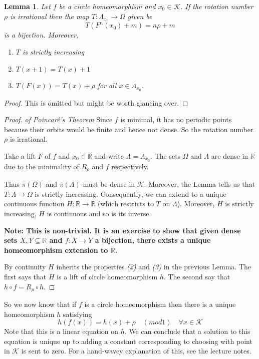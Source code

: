 \documentclass[11pt]{article}
\newcommand{\R}{\mathbb{R}}
\newenvironment{note}
	{\begin{mdframed}[backgroundcolor=white, linecolor=red, roundcorner=5pt, linewidth=1pt]\bfseries{Note:}\normalfont
	\setlength{\parindent}{0pt}}
	{\end{mdframed}}
\newtheorem{lemma}[theorem]{Lemma}
\begin{document}
\begin{lemma}
Let $f$ be a circle homeomorphism and $x_0\in\mathcal{K}$.
If the rotation number $\rho$ is irrational then the map $T:\Lambda_{x_0}\to\Omega$ given be
\[
	T(F^n(x_0)+m)=n\rho +m
\]
is a bijection.
Moreover,
\begin{enumerate}
	\item $T$ is strictly increasing
	\item $T(x+1) = T(x) + 1$
	\item $T(F(x))= T(x) + \rho$ for all $x\in\Lambda_{x_0}$.
\end{enumerate}
\end{lemma}

\begin{proof}
This is omitted but might be worth glancing over.
\end{proof}

\begin{proof}
\textit{of Poincar\'e's Theorem}
Since $f$ is minimal, it has no periodic points because their orbits would be finite and hence not dense.
So the rotation number $\rho$ is irrational.


Take a lift $F$ of $f$ and $x_0\in \R$ and write $\Lambda=\Lambda_{x_0}$.
The sets $\Omega$ and $\Lambda$ are dense in $\R$ due to the minimality of $R_\rho$ and $f$ respectively.

Thus $\pi(\Omega)$ and $\pi(\Lambda)$ must be dense in $\mathcal{K}$.
Moreover, the Lemma tells us that $T:\Lambda\to\Omega$ is strictly increasing.
Consequently, we can extend to a unique continuous function $H:\R \to \R$ (which restricts to $T$ on $\Lambda$).
Moreover, $H$ is strictly increasing, $H$ is continuous and so is its inverse.

\begin{note}
This is non-trivial.
It is an exercise to show that given dense sets $X,Y\subseteq \R$ and $f:X\to Y$ a bijection, there exists a unique homeomorphism extension to $\R$.
\end{note}

By continuity $H$ inherits the properties \textit{(2)} and \textit{(3)} in the previous Lemma.
The first says that $H$ is a lift of circle homeomorphism $h$.
The second say that $h\circ f= R_\rho \circ h$.
\end{proof}

So we now know that if $f$ is a circle homeomorphism then there is a unique homeomorphism $h$ satisfying
\[
	h(f(x))= h(x) + \rho \quad (mod 1) \quad \forall x\in\mathcal{K}
\]
Note that this is a linear equation on $h$.
We can conclude that a solution to this equation is unique up to adding a constant corresponding to choosing with point in $\mathcal{K}$ is sent to zero.
For a hand-wavey explanation of this, see the lecture notes.
\end{document}
